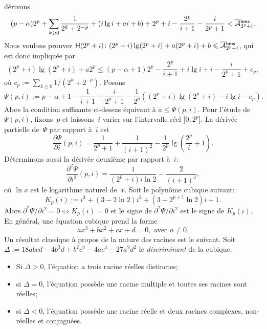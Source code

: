 dérivons
\begin{equation*}
(p-\alpha)2^p + \sum_{k \geqslant
    0}\frac{1}{2^{k}+2^{-p}}
+ (i\lg i + ai + b) + 2^p + i -
\frac{2^p}{i+1} - \frac{i}{2^p+1} < \OM{\fun{bms}}{2^p+i}.
\end{equation*}
Nous voulons prouver \(\pred{H}{2^p+i} \colon (2^p+i)\lg(2^p+i) +
a(2^p+i) + b \leqslant \OM{\fun{bms}}{2^p+i}\), qui est donc impliquée
par
\begin{equation*}
(2^p+i)\lg(2^p+i) + a2^p \leqslant (p - \alpha + 1)2^p -
\frac{2^p}{i+1} + i\lg i + i - \frac{i}{2^p+1} + c_p,
\end{equation*}
où \(c_p := \sum_{k \geqslant 0}1/(2^{k}+2^{-p})\). Posons
\begin{equation*}
  \Psi(p,i) := p - \alpha + 1 - \frac{1}{i+1} + \frac{i}{2^p+1} -
  \frac{1}{2^p}((2^p+i)\lg(2^p+i) - i\lg i - c_p).
\end{equation*}
Alors la condition suffisante ci-dessus équivaut à \(a \leqslant
\Psi(p,i)\). Pour l'étude de \(\Psi(p,i)\), fixons~\(p\) et
laissons~\(i\) varier sur l'intervalle réel \(]0,2^p]\). La dérivée
partielle de~\(\Psi\) par rapport à~\(i\) est
\begin{equation*}
\frac{\partial\Psi}{\partial i}(p,i) = \frac{1}{2^p+1}
+ \frac{1}{(i+1)^2} - \frac{1}{2^p}\lg\left(\frac{2^p}{i}+1\right).
\end{equation*}
Déterminons aussi la dérivée deuxième par rapport à~\(i\):
\begin{equation*}
\frac{\partial^2\Psi}{\partial i^2}(p,i) = \frac{1}{(2^p+i)i\ln 2} - \frac{2}{(i+1)^3},
\end{equation*}
où \(\ln x\) est le logarithme naturel de~\(x\). Soit le polynôme
cubique suivant:
\begin{equation*}
K_p(i) := i^3 + (3 - 2\ln 2)i^2 + (3 - 2^{p+1}\ln 2)i + 1.
\end{equation*}
Alors \(\partial^2\Psi/\partial i^2 = 0 \Leftrightarrow K_p(i) = 0\)
et le signe de \(\partial^2\Psi/\partial i^2\) est le signe de
\(K_p(i)\). En général, une équation cubique prend la forme
\begin{equation*}
ax^3 + bx^2 + cx + d = 0, \; \text{avec \(a \neq 0\)}.
\end{equation*}
Un résultat classique à propos de la nature des racines est le
suivant. Soit \(\Delta := 18abcd - 4b^3d + b^2c^2 - 4ac^3 - 27a^2d^2\)
le \emph{discriminant} de la cubique.
\begin{itemize}

  \item Si \(\Delta > 0\), l'équation a trois racine réelles
    distinctes;

  \item si \(\Delta = 0\), l'équation possède une racine multiple et
    toutes ses racines sont réelles;

  \item si \(\Delta < 0\), l'équation possède une racine réelle et
    deux racines complexes, non-réelles et conjuguées.

\end{itemize}
